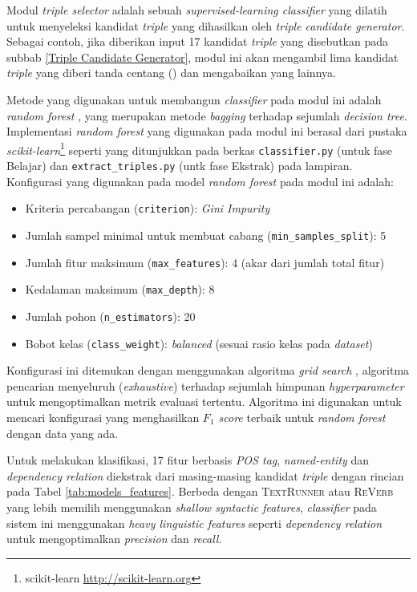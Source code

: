 Modul \textit{triple selector} adalah sebuah \textit{supervised-learning classifier} yang dilatih untuk menyeleksi kandidat \textit{triple} yang dihasilkan oleh \textit{triple candidate generator}. Sebagai contoh, jika diberikan input 17 kandidat \textit{triple} yang disebutkan pada subbab \ref{Triple Candidate Generator}, modul ini akan mengambil lima kandidat \textit{triple} yang diberi tanda centang () dan mengabaikan yang lainnya.

Metode yang digunakan untuk membangun \textit{classifier} pada modul ini adalah \textit{random forest} \citep{breiman2001random}, yang merupakan metode \textit{bagging} terhadap sejumlah \textit{decision tree}. Implementasi \textit{random forest} yang digunakan pada modul ini berasal dari pustaka \textit{scikit-learn}\footnote{scikit-learn \url{http://scikit-learn.org}} seperti yang ditunjukkan pada berkas \verb|classifier.py| (untuk fase Belajar) dan \verb|extract_triples.py| (untk fase Ekstrak) pada lampiran. Konfigurasi yang digunakan pada model \textit{random forest} pada modul ini adalah:

\begin{itemize}
\item Kriteria percabangan (\verb|criterion|): \textit{Gini Impurity}
\item Jumlah sampel minimal untuk membuat cabang  (\verb|min_samples_split|): 5
\item Jumlah fitur maksimum  (\verb|max_features|): 4 (akar dari jumlah total fitur)
\item Kedalaman maksimum  (\verb|max_depth|): 8
\item Jumlah pohon (\verb|n_estimators|): 20
\item Bobot kelas (\verb|class_weight|): \textit{balanced} (sesuai rasio kelas pada \textit{dataset})
\end{itemize}

Konfigurasi ini ditemukan dengan menggunakan algoritma \textit{grid search} \citep{wasserman2015grid}, algoritma pencarian menyeluruh (\textit{exhaustive}) terhadap sejumlah himpunan \textit{hyperparameter} untuk mengoptimalkan metrik evaluasi tertentu. Algoritma ini digunakan untuk mencari konfigurasi yang menghasilkan \textit{$F_1$ score} terbaik untuk \textit{random forest} dengan data yang ada.

Untuk melakukan klasifikasi, 17 fitur berbasis \textit{POS tag}, \textit{named-entity} dan \textit{dependency relation} diekstrak dari masing-masing kandidat \textit{triple} dengan rincian pada Tabel \ref{tab:models_features}. Berbeda dengan \textsc{TextRunner} atau \textsc{ReVerb} \citep{banko2007open} \citep{etzioni2011open} yang lebih memilih menggunakan \textit{shallow syntactic features}, \textit{classifier} pada sistem ini menggunakan \textit{heavy linguistic features} seperti \textit{dependency relation} untuk mengoptimalkan \textit{precision} dan \textit{recall}.

